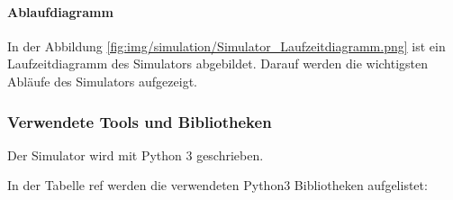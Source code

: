 \documentclass[../main.tex]{subfiles}
\begin{document}
\paragraph{Ablaufdiagramm}
In der Abbildung \ref{fig:img/simulation/Simulator_Laufzeitdiagramm.png} ist ein Laufzeitdiagramm des Simulators abgebildet. Darauf werden die wichtigsten Abläufe des Simulators aufgezeigt. 


\subsubsection{Verwendete Tools und Bibliotheken}

Der Simulator wird mit Python 3 geschrieben.

In der Tabelle ref werden die verwendeten Python3 Bibliotheken aufgelistet:

\end{document}

